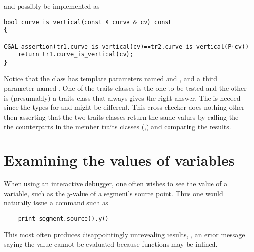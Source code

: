 and possibly be implemented as 

\begin{verbatim}
bool curve_is_vertical(const X_curve & cv) const
{
    CGAL_assertion(tr1.curve_is_vertical(cv)==tr2.curve_is_vertical(P(cv)));
    return tr1.curve_is_vertical(cv);
}
\end{verbatim}

Notice that the class  has template parameters 
named  and , and a third parameter named 
. One of the traits classes is the one to be tested and the
other is (presumably) a traits class that always gives the right answer.
The  is needed since the  types 
for  and  might be different. 
This cross-checker does nothing other then asserting that the two traits 
classes return the same values by calling the 
the counterparts in the member traits classes 
(,) and comparing the results.


\section{Examining the values of variables\label{sec:debugging_handles_and_it}}

When using an interactive debugger, one often wishes to see the value of
a variable, such as the $y$-value of a segment's source point. Thus one
would naturally issue a command such as
\begin{verbatim}
    print segment.source().y()
\end{verbatim}
This most often produces disappointingly unrevealing results, \eg, an
error message saying the value cannot be evaluated because functions may
be inlined.  

